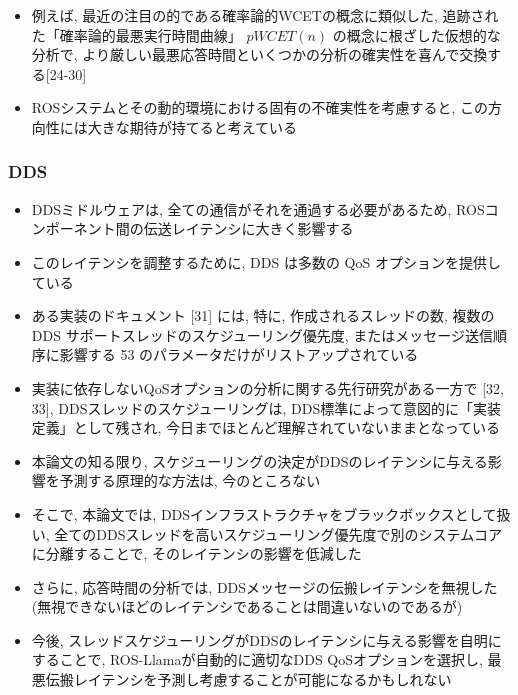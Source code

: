 \begin{frame}{}
    \begin{itemize}
        \item 例えば, 最近の注目の的である確率論的WCETの概念に類似した, 追跡された「確率論的最悪実行時間曲線」 $p W C E T(n)$ の概念に根ざした仮想的な分析で, より厳しい最悪応答時間といくつかの分析の確実性を喜んで交換する[24-30]
        \item ROSシステムとその動的環境における固有の不確実性を考慮すると, この方向性には大きな期待が持てると考えている
    \end{itemize}
\end{frame}


\subsubsection{DDS}
\label{sssec: dds}

\begin{frame}{}
    \begin{itemize}
        \item DDSミドルウェアは, 全ての通信がそれを通過する必要があるため, ROSコンポーネント間の伝送レイテンシに大きく影響する
        \item このレイテンシを調整するために, DDS は多数の QoS オプションを提供している
        \item ある実装のドキュメント [31] には, 特に, 作成されるスレッドの数, 複数の DDS サポートスレッドのスケジューリング優先度, またはメッセージ送信順序に影響する 53 のパラメータだけがリストアップされている
        \item 実装に依存しないQoSオプションの分析に関する先行研究がある一方で [32, 33], DDSスレッドのスケジューリングは, DDS標準によって意図的に「実装定義」として残され, 今日までほとんど理解されていないままとなっている
        \item 本論文の知る限り, スケジューリングの決定がDDSのレイテンシに与える影響を予測する原理的な方法は, 今のところない
    \end{itemize}
\end{frame}

\begin{frame}{}
    \begin{itemize}
        \item そこで, 本論文では, DDSインフラストラクチャをブラックボックスとして扱い, 全てのDDSスレッドを高いスケジューリング優先度で別のシステムコアに分離することで, そのレイテンシの影響を低減した
        \item さらに, 応答時間の分析では, DDSメッセージの伝搬レイテンシを無視した (無視できないほどのレイテンシであることは間違いないのであるが)
        \item 今後, スレッドスケジューリングがDDSのレイテンシに与える影響を自明にすることで, ROS-Llamaが自動的に適切なDDS QoSオプションを選択し, 最悪伝搬レイテンシを予測し考慮することが可能になるかもしれない
    \end{itemize}
\end{frame}


